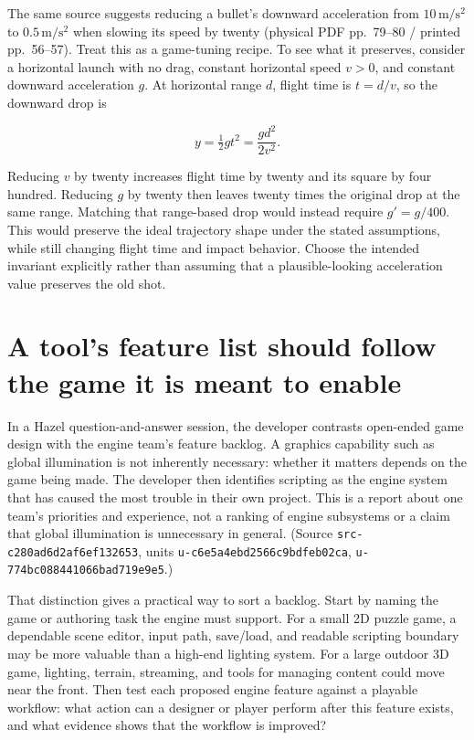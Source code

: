 The same source suggests reducing a bullet's downward acceleration from \(10\,\mathrm{m/s^2}\) to \(0.5\,\mathrm{m/s^2}\) when slowing its speed by twenty (physical PDF pp.~79--80 / printed pp.~56--57). Treat this as a game-tuning recipe. To see what it preserves, consider a horizontal launch with no drag, constant horizontal speed \(v>0\), and constant downward acceleration \(g\). At horizontal range \(d\), flight time is \(t=d/v\), so the downward drop is

\[
y=\tfrac12g t^2=\frac{g d^2}{2v^2}.
\]

Reducing \(v\) by twenty increases flight time by twenty and its square by four hundred. Reducing \(g\) by twenty then leaves twenty times the original drop at the same range. Matching that range-based drop would instead require \(g'=g/400\). This would preserve the ideal trajectory shape under the stated assumptions, while still changing flight time and impact behavior. Choose the intended invariant explicitly rather than assuming that a plausible-looking acceleration value preserves the old shot.

\section{A tool's feature list should follow the game it is meant to enable}\label{06-engine-ii-ch047-a-tools-feature-list-should-follow-the-game-it-is-meant-to-enable}

In a Hazel question-and-answer session, the developer contrasts open-ended game design with the engine team's feature backlog. A graphics capability such as global illumination is not inherently necessary: whether it matters depends on the game being made. The developer then identifies scripting as the engine system that has caused the most trouble in their own project. This is a report about one team's priorities and experience, not a ranking of engine subsystems or a claim that global illumination is unnecessary in general. (Source \texttt{src-c280ad6d2af6ef132653}, units \texttt{u-c6e5a4ebd2566c9bdfeb02ca}, \texttt{u-774bc088441066bad719e9e5}.)

That distinction gives a practical way to sort a backlog. Start by naming the game or authoring task the engine must support. For a small 2D puzzle game, a dependable scene editor, input path, save/load, and readable scripting boundary may be more valuable than a high-end lighting system. For a large outdoor 3D game, lighting, terrain, streaming, and tools for managing content could move near the front. Then test each proposed engine feature against a playable workflow: what action can a designer or player perform after this feature exists, and what evidence shows that the workflow is improved?


